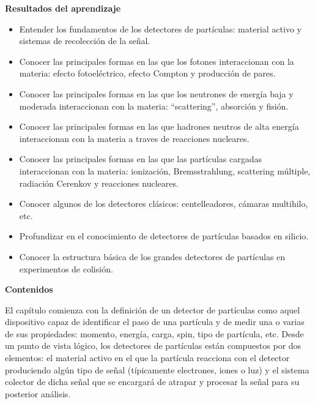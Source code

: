 \newpage

\textbf{Resultados del aprendizaje}

\begin{itemize}
    \item Entender los fundamentos de los detectores de partículas: material activo y sistemas de recolección de la señal.
    \item Conocer las principales formas en las que los fotones interaccionan con la materia: efecto fotoeléctrico, efecto Compton y producción de pares.
    \item Conocer las principales formas en las que los neutrones de energía baja y moderada interaccionan con la materia: ``scattering'', absorción y fisión.
    \item Conocer las principales formas en las que hadrones neutros de alta energía interaccionan con la materia a traves de reacciones nucleares.
    \item Conocer las principales formas en las que las partículas cargadas interaccionan con la materia: ionización, Bremsstrahlung, scattering múltiple, radiación Cerenkov y reacciones nucleares.
    \item Conocer algunos de los detectores clásicos: centelleadores, cámaras multihilo, etc.
    \item Profundizar en el conocimiento de detectores de partículas basados en silicio.
    \item Conocer la estructura básica de los grandes detectores de partículas en experimentos de colisión.
\end{itemize}

\textbf{Contenidos}

El capítulo comienza con la definición de un detector de partículas como aquel dispositivo capaz de identificar el paso de una partícula y de medir una o varias de sus propiedades: momento, energía, carga, spin, tipo de partícula, etc. Desde un punto de vista lógico, los detectores de partículas están compuestos por dos elementos: el material activo en el que la partícula reacciona con el detector produciendo algún tipo de señal (típicamente electrones, iones o luz) y el sistema colector de dicha señal que se encargará de atrapar y procesar la señal para su posterior análisis.

